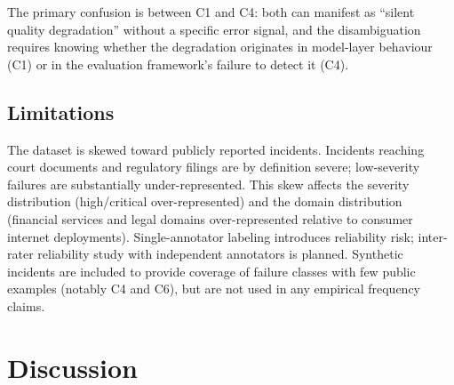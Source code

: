 \documentclass{article}
\begin{document}
\begin{table}[t]
\caption{Rule-based classifier precision and recall per class.}
\label{tab:classifier}
\centering
\small
{}
\end{table}

The primary confusion is between C1 and C4: both can manifest as ``silent
quality degradation'' without a specific error signal, and the disambiguation
requires knowing whether the degradation originates in model-layer behaviour
(C1) or in the evaluation framework's failure to detect it (C4).

\subsection{Limitations}

The dataset is skewed toward publicly reported incidents.  Incidents reaching
court documents and regulatory filings are by definition severe; low-severity
failures are substantially under-represented.  This skew affects the severity
distribution (high/critical over-represented) and the domain distribution
(financial services and legal domains over-represented relative to consumer
internet deployments).  Single-annotator labeling introduces reliability risk;
inter-rater reliability study with independent annotators is planned.
Synthetic incidents are included to provide coverage of failure classes with
few public examples (notably C4 and C6), but are not used in any empirical
frequency claims.

\section{Discussion}
\label{sec:discussion}
\end{document}
